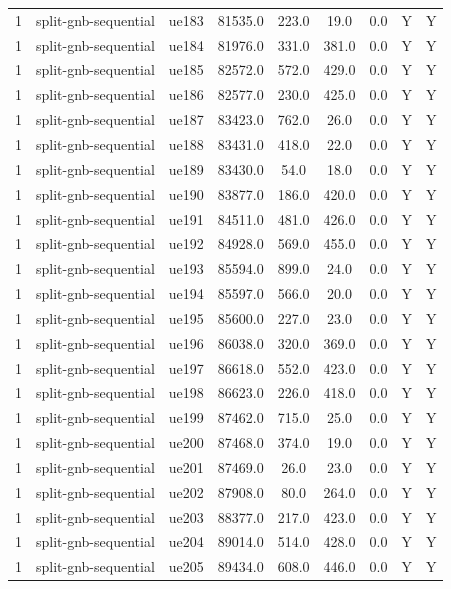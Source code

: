 \begin{table}[ht]
\begin{tabular}{|c|c|c|c|c|c|c|c|c|}
1 & split-gnb-sequential & ue183 & 81535.0 & 223.0 & 19.0 & 0.0 & Y & Y \\
1 & split-gnb-sequential & ue184 & 81976.0 & 331.0 & 381.0 & 0.0 & Y & Y \\
1 & split-gnb-sequential & ue185 & 82572.0 & 572.0 & 429.0 & 0.0 & Y & Y \\
1 & split-gnb-sequential & ue186 & 82577.0 & 230.0 & 425.0 & 0.0 & Y & Y \\
1 & split-gnb-sequential & ue187 & 83423.0 & 762.0 & 26.0 & 0.0 & Y & Y \\
1 & split-gnb-sequential & ue188 & 83431.0 & 418.0 & 22.0 & 0.0 & Y & Y \\
1 & split-gnb-sequential & ue189 & 83430.0 & 54.0 & 18.0 & 0.0 & Y & Y \\
1 & split-gnb-sequential & ue190 & 83877.0 & 186.0 & 420.0 & 0.0 & Y & Y \\
1 & split-gnb-sequential & ue191 & 84511.0 & 481.0 & 426.0 & 0.0 & Y & Y \\
1 & split-gnb-sequential & ue192 & 84928.0 & 569.0 & 455.0 & 0.0 & Y & Y \\
1 & split-gnb-sequential & ue193 & 85594.0 & 899.0 & 24.0 & 0.0 & Y & Y \\
1 & split-gnb-sequential & ue194 & 85597.0 & 566.0 & 20.0 & 0.0 & Y & Y \\
1 & split-gnb-sequential & ue195 & 85600.0 & 227.0 & 23.0 & 0.0 & Y & Y \\
1 & split-gnb-sequential & ue196 & 86038.0 & 320.0 & 369.0 & 0.0 & Y & Y \\
1 & split-gnb-sequential & ue197 & 86618.0 & 552.0 & 423.0 & 0.0 & Y & Y \\
1 & split-gnb-sequential & ue198 & 86623.0 & 226.0 & 418.0 & 0.0 & Y & Y \\
1 & split-gnb-sequential & ue199 & 87462.0 & 715.0 & 25.0 & 0.0 & Y & Y \\
1 & split-gnb-sequential & ue200 & 87468.0 & 374.0 & 19.0 & 0.0 & Y & Y \\
1 & split-gnb-sequential & ue201 & 87469.0 & 26.0 & 23.0 & 0.0 & Y & Y \\
1 & split-gnb-sequential & ue202 & 87908.0 & 80.0 & 264.0 & 0.0 & Y & Y \\
1 & split-gnb-sequential & ue203 & 88377.0 & 217.0 & 423.0 & 0.0 & Y & Y \\
1 & split-gnb-sequential & ue204 & 89014.0 & 514.0 & 428.0 & 0.0 & Y & Y \\
1 & split-gnb-sequential & ue205 & 89434.0 & 608.0 & 446.0 & 0.0 & Y & Y \\

\end{tabular}
\end{table}
